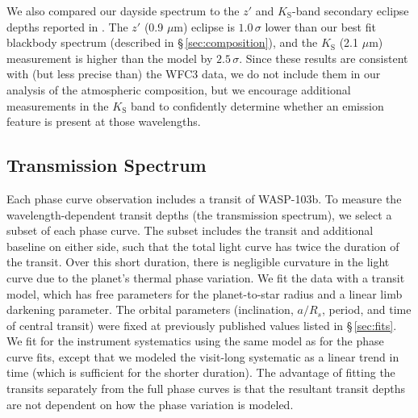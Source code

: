 \documentclass[twocolumn]{aastex61}
\begin{document}

We also compared our dayside spectrum to the $z'$ and $K_\mathrm{S}$-band secondary eclipse depths reported in \cite{delrez18}. The $z'$ (0.9 $\mu$m) eclipse is $1.0\,\sigma$ lower than our best fit blackbody spectrum (described in \S\,\ref{sec:composition}), and the $K_\mathrm{S}$ (2.1 $\mu$m) measurement is higher than the model by $2.5\,\sigma$. Since these results are consistent with (but less precise than) the WFC3 data, we do not include them in our analysis of the atmospheric composition, but we encourage additional measurements in the $K_\mathrm{S}$ band to confidently determine whether an emission feature is present at those wavelengths.

\subsection{Transmission Spectrum}
Each phase curve observation includes a transit of WASP-103b. To measure the wavelength-dependent transit depths (the transmission spectrum), we select a subset of each phase curve. The subset includes the transit and additional baseline on either side, such that the total light curve has twice the duration of the transit. Over this short duration, there is negligible curvature in the light curve due to the planet's thermal phase variation. We fit the data with a transit model, which has free parameters for the planet-to-star radius and a linear limb darkening parameter. The orbital parameters (inclination, $a/R_s$, period, and time of central transit) were fixed at previously published values listed in \S\,\ref{sec:fits}. We fit for the instrument systematics using the same model as for the phase curve fits, except that we modeled the visit-long systematic as a linear trend in time (which is sufficient for the shorter duration). The advantage of fitting the transits separately from the full phase curves is that the resultant transit depths are not dependent on how the phase variation is modeled. 
\end{document}
